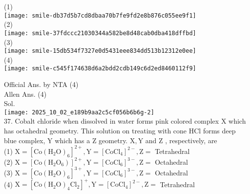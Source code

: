 \documentclass[10pt]{article}
\begin{document}
(1)\\
\texttt{[image: smile-db37d5b7cd8dbaa70b7fe9fd2e8b876c055ee9f1]}\\
(2)\\
\texttt{[image: smile-37fdccc21030344a582be8d48cab0dba418dffbd]}\\
(3)\\
\texttt{[image: smile-15db534f7327e0d5431eee834dd513b12312e0ee]}\\
(4)\\
\texttt{[image: smile-c545f174638d6a2bdd2cdb149c6d2ed8460112f9]}

Official Ans. by NTA (4)\\
Allen Ans. (4)\\
Sol.\\
\texttt{[image: 2025\_10\_02\_e189b9aa2c5cf056b6b6g-2]}\\
37. Cobalt chloride when dissolved in water forms pink colored complex X which has octahedral geometry. This solution on treating with cone HCl forms deep blue complex, Y which has a Z geometry. \(\mathrm{X}, \mathrm{Y}\) and Z , respectively, are\\
(1) \(\mathrm{X}=\left[\mathrm{Co}\left(\mathrm{H}_{2} \mathrm{O}\right)_{6}\right]^{2+}, \mathrm{Y}=\left[\mathrm{CoCl}_{4}\right]^{2-}, \mathrm{Z}=\) Tetrahedral\\
(2) \(\mathrm{X}=\left[\mathrm{Co}\left(\mathrm{H}_{2} \mathrm{O}_{6}\right)\right]^{2+}, \mathrm{Y}=\left[\mathrm{CoCl}_{6}\right]^{3-}, \mathrm{Z}=\) Octahedral\\
(3) \(\mathrm{X}=\left[\mathrm{Co}\left(\mathrm{H}_{2} \mathrm{O}\right)_{6}\right]^{3+}, \mathrm{Y}=\left[\mathrm{CoCl}_{6}\right]^{3-}, \mathrm{Z}=\) Octahedral\\
(4) \(\mathrm{X}=\left[\mathrm{Co}\left(\mathrm{H}_{2} \mathrm{O}\right)_{4} \mathrm{Cl}_{2}\right]^{+}, \mathrm{Y}=\left[\mathrm{CoCl}_{4}\right]^{2-}, \mathrm{Z}=\) Tetrahedral
\end{document}
